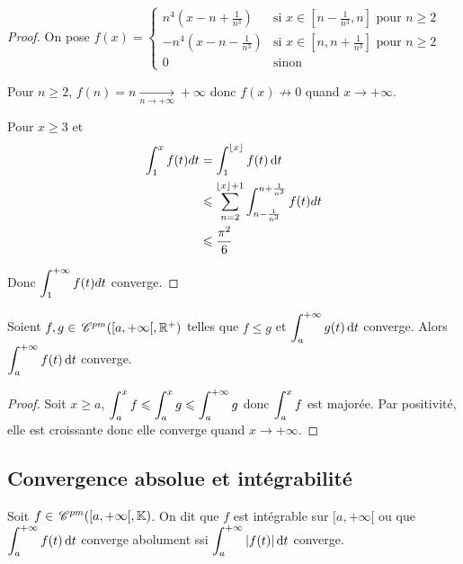 \begin{proof}
    On pose $f(x) = \begin{cases}
        n^4\left( x - n + \frac 1 {n^3} \right) & \text{si } x \in \left[ n - \frac 1 {n^3}, n \right] \text{ pour } n \geqslant 2 \\
        -n^4\left( x - n - \frac 1 {n^3} \right) & \text{si } x \in \left[ n, n + \frac 1 {n^3} \right] \text{ pour } n \geqslant 2 \\
        0 & \text{sinon}
    \end{cases}$

    Pour $n \geqslant 2$, $f(n) = n \xrightarrow[n \to + \infty   ]{} + \infty$ donc 
    $f(x) \nrightarrow 0$ quand $x \to + \infty$.

    Pour $x \geqslant 3$ et 
    \begin{align}
        \int_1^x f(t) dt &= \int_{1}^{\lfloor x \rfloor} f(t) \,\mathrm{d}t \\
        & \leqslant \sum_{n=2}^{\lfloor x \rfloor + 1} \int_{n - \frac 1 {n^3}}^{n + \frac 1 {n^3}} f(t) dt \\
        & \leqslant \frac{\pi^2}{6}
    \end{align}

    Donc $\displaystyle \int_1^{+ \infty} f(t) dt$ converge.
\end{proof}

\begin{theoreme}{}{}
    Soient $f, g \in \,\mathscr C^{pm}([a, + \infty[, \mathbb{R}^+)$ telles que $f \leqslant g$ et 
    $\displaystyle \int_a^{+ \infty} g(t) \,\mathrm{d}t$ converge. Alors $\displaystyle \int_a^{+ \infty} f(t) \,\mathrm{d}t$ converge.
\end{theoreme}

\begin{proof}
    Soit $x \geqslant a$, $\displaystyle \int_a^x f \leqslant \int_a^x g \leqslant \int_a^{+ \infty} g$ donc
    $\displaystyle \int_a^x f$ est majorée. Par positivité, elle est croissante donc
    elle converge quand $x \to + \infty$.
\end{proof}

\subsection{Convergence absolue et intégrabilité}

\begin{definition}{}{}
    Soit $f \in \,\mathscr C^{pm}([a, + \infty[, \mathbb{K})$. On dit que $f$ est intégrable sur $[a, + \infty[$
    ou que $\displaystyle \int_a^{+ \infty} f(t) \,\mathrm{d}t$ converge abolument ssi $\displaystyle \int_a^{+ \infty} |f(t)| \,\mathrm{d}t$ converge.
\end{definition}


